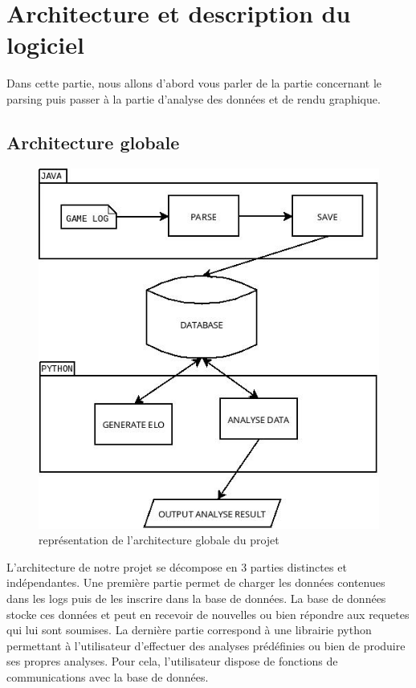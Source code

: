 \chapter{Architecture et description du logiciel}
Dans cette partie, nous allons d'abord vous parler de la partie concernant le parsing puis passer à la partie d'analyse des données et de rendu graphique.

\section{Architecture globale}

\begin{figure}[!h]
  \begin{center}
    \includegraphics[scale=0.45, keepaspectratio]{./presentation/overview.jpg}
  \end{center}
  \caption{représentation de l'architecture globale du projet}
\end{figure}

L'architecture de notre projet se décompose en 3 parties distinctes et indépendantes. Une première partie permet de charger les données contenues dans les logs puis de les inscrire dans la base de données.\newline
La base de données stocke ces données et peut en recevoir de nouvelles ou bien répondre aux requetes qui lui sont soumises.\newline
La dernière partie correspond à une librairie python permettant à l'utilisateur d'effectuer des analyses prédéfinies ou bien de produire ses propres analyses. Pour cela, l'utilisateur dispose de fonctions de communications avec la base de données.

